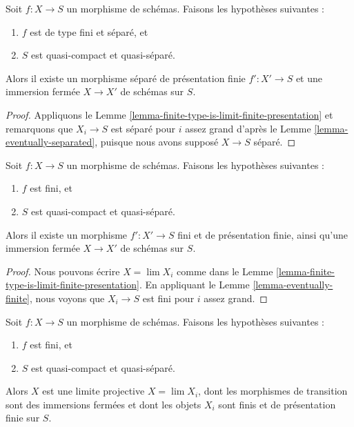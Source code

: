 \begin{proposition}
\label{proposition-separated-closed-in-finite-presentation}
Soit $f : X \to S$ un morphisme de schémas. Faisons les hypothèses suivantes :
\begin{enumerate}
\item $f$ est de type fini et séparé, et
\item $S$ est quasi-compact et quasi-séparé.
\end{enumerate}
Alors il existe un morphisme séparé de présentation finie $f' : X' \to S$
et une immersion fermée $X \to X'$ de schémas sur $S$.
\end{proposition}

\begin{proof}
Appliquons le Lemme \ref{lemma-finite-type-is-limit-finite-presentation} et
remarquons que $X_i \to S$ est séparé pour $i$ assez grand d'après le
Lemme \ref{lemma-eventually-separated}, puisque nous avons supposé
$X \to S$ séparé.
\end{proof}

\begin{lemma}
\label{lemma-finite-closed-in-finite-finite-presentation}
Soit $f : X \to S$ un morphisme de schémas. Faisons les hypothèses suivantes :
\begin{enumerate}
\item $f$ est fini, et
\item $S$ est quasi-compact et quasi-séparé.
\end{enumerate}
Alors il existe un morphisme $f' : X' \to S$ fini et de présentation finie,
ainsi qu'une immersion fermée $X \to X'$ de schémas sur $S$.
\end{lemma}

\begin{proof}
Nous pouvons écrire $X = \lim X_i$ comme dans le
Lemme \ref{lemma-finite-type-is-limit-finite-presentation}. En appliquant le
Lemme \ref{lemma-eventually-finite}, nous voyons que $X_i \to S$ est fini
pour $i$ assez grand.
\end{proof}

\begin{lemma}
\label{lemma-finite-in-finite-and-finite-presentation}
Soit $f : X \to S$ un morphisme de schémas. Faisons les hypothèses suivantes :
\begin{enumerate}
\item $f$ est fini, et
\item $S$ est quasi-compact et quasi-séparé.
\end{enumerate}
Alors $X$ est une limite projective $X = \lim X_i$, dont les morphismes de
transition sont des immersions fermées et dont les objets $X_i$ sont finis
et de présentation finie sur $S$.
\end{lemma}

